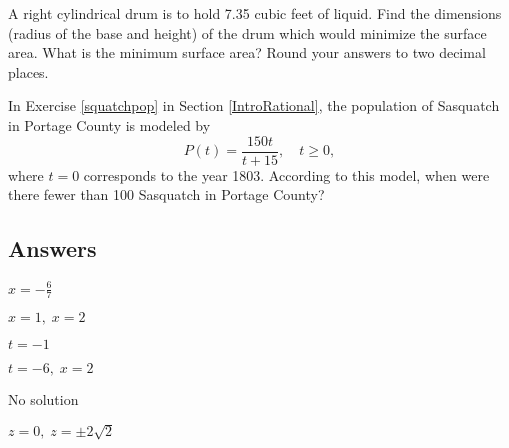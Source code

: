 \begin{exenum}
\begin{enumerate}
\end{enumerate}

\item  A right cylindrical drum is to hold 7.35 cubic feet of liquid.  Find the dimensions (radius of the base and height) of the drum which would minimize the surface area.  What is the minimum surface area?  Round your answers to two decimal places.

\item In Exercise \ref{squatchpop} in Section \ref{IntroRational}, the population of Sasquatch in Portage County is modeled by  \[P(t) = \frac{150t}{t + 15}, \quad t \geq 0,\] where $t = 0$ corresponds to the year 1803.  According to this model, when were there fewer than 100 Sasquatch in Portage County?

\end{exenum}

\clearpage

\subsection{Answers}

\startexenum

\begin{shortexenum}
\item $x = -\frac{6}{7}$
\item $x = 1, \; x = 2$
\item $t = -1$
\item $t = -6, \; x = 2$
\item No solution
\item $z = 0, \; z = \pm 2\sqrt{2}$
\end{shortexenum}

